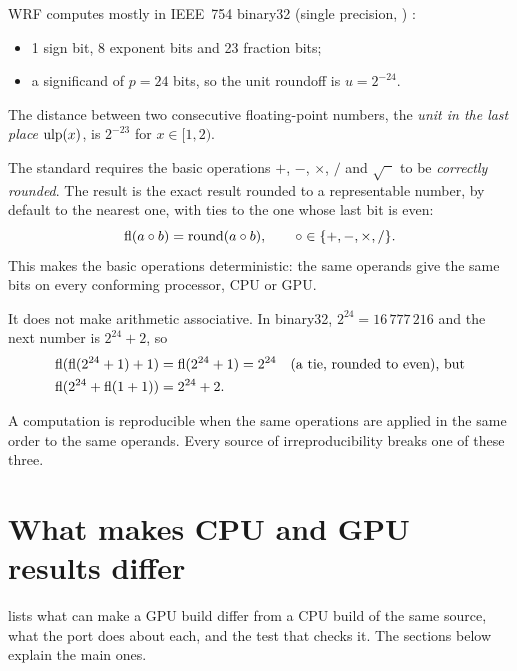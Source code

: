 WRF computes mostly in IEEE~754 binary32 (single precision, ) \citep{ieee754}:
\begin{itemize}
  \item 1 sign bit, 8 exponent bits and 23 fraction bits;
  \item a significand of $p = 24$ bits, so the unit roundoff is $u = 2^{-24}$.
\end{itemize}
The distance between two consecutive floating-point numbers, the \emph{unit in the last place} $\operatorname{ulp}(x)$, is
$2^{-23}$ for $x \in [1,2)$.

The standard requires the basic operations $+$, $-$, $\times$, $/$ and $\sqrt{\phantom{x}}$ to be \emph{correctly
rounded}. The result is the exact result rounded to a representable number, by default to the nearest one, with ties
to the one whose last bit is even:
\begin{equation}
  \operatorname{fl}(a \circ b) = \operatorname{round}(a \circ b), \qquad \circ \in \{+,-,\times,/\}.
\end{equation}
This makes the basic operations deterministic: the same operands give the same bits on every conforming processor,
CPU or GPU.

It does not make arithmetic associative. In binary32, $2^{24} = 16\,777\,216$ and the next number is $2^{24}+2$, so
\begin{align}
  \operatorname{fl}(\operatorname{fl}(2^{24} + 1) + 1) &= \operatorname{fl}(2^{24} + 1) = 2^{24} \quad\text{(a tie, rounded to even), but}\\
  \operatorname{fl}(2^{24} + \operatorname{fl}(1 + 1)) &= 2^{24} + 2.
\end{align}

\begin{keypoint}
A computation is reproducible when the same operations are applied in the same order to the same operands. Every
source of irreproducibility breaks one of these three.
\end{keypoint}

\section{What makes CPU and GPU results differ}

 lists what can make a GPU build differ from a CPU build of the same source, what the port
does about each, and the test that checks it. The sections below explain the main ones.

